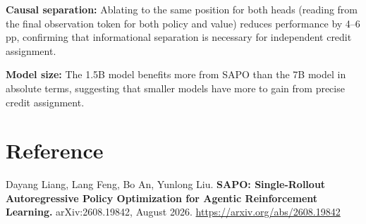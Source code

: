 \documentclass[10pt,twocolumn]{article}
\begin{document}
\textbf{Causal separation:} Ablating to the same position for both
heads (reading from the final observation token for both policy and
value) reduces performance by 4--6 pp, confirming that informational
separation is necessary for independent credit assignment.

\textbf{Model size:} The 1.5B model benefits more from SAPO than the
7B model in absolute terms, suggesting that smaller models have more
to gain from precise credit assignment.

\section*{Reference}

Dayang Liang, Lang Feng, Bo An, Yunlong Liu.
\textbf{SAPO: Single-Rollout Autoregressive Policy Optimization
for Agentic Reinforcement Learning.}
arXiv:2608.19842, August 2026.
\url{https://arxiv.org/abs/2608.19842}
\end{document}
